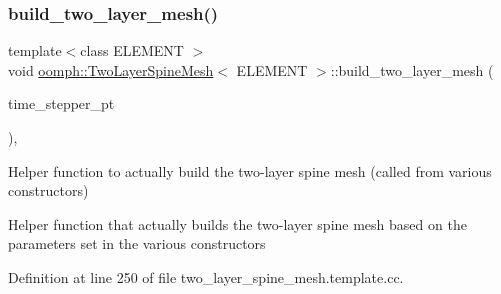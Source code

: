 \subsubsection{\texorpdfstring{build\+\_\+two\+\_\+layer\+\_\+mesh()}{build\_two\_layer\_mesh()}}
{\footnotesize\ttfamily template$<$class E\+L\+E\+M\+E\+NT $>$ \\
void \hyperlink{classoomph_1_1TwoLayerSpineMesh}{oomph\+::\+Two\+Layer\+Spine\+Mesh}$<$ E\+L\+E\+M\+E\+NT $>$\+::build\+\_\+two\+\_\+layer\+\_\+mesh (\begin{DoxyParamCaption}\item[{\hyperlink{classoomph_1_1TimeStepper}{Time\+Stepper} $\ast$}]{time\+\_\+stepper\+\_\+pt }\end{DoxyParamCaption})\hspace{0.3cm}{\ttfamily [protected]}, {\ttfamily [virtual]}}



Helper function to actually build the two-\/layer spine mesh (called from various constructors) 

Helper function that actually builds the two-\/layer spine mesh based on the parameters set in the various constructors 

Definition at line 250 of file two\+\_\+layer\+\_\+spine\+\_\+mesh.\+template.\+cc.



